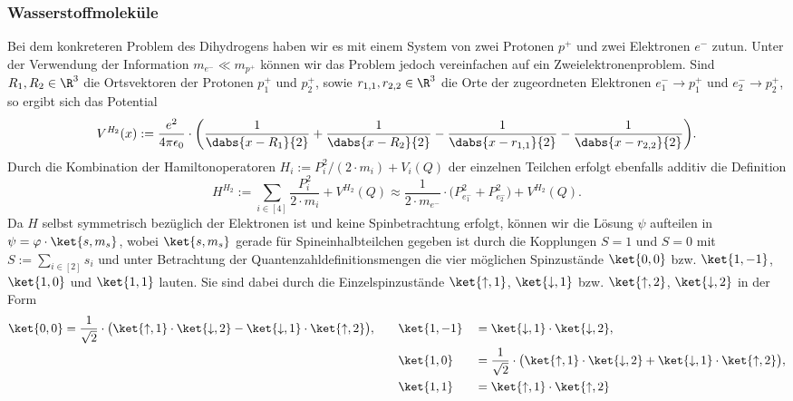 \documentclass[../main.tex]{subfiles}
\begin{document}
        \subsubsection*{Wasserstoffmoleküle}
            Bei dem konkreteren Problem des Dihydrogens  haben wir es mit einem System von zwei Protonen $p^+$ und zwei Elektronen $e^-$ zutun. Unter der Verwendung der Information $m_{e^-}\ll m_{p^+}$ können wir das Problem jedoch vereinfachen auf ein Zweielektronenproblem. Sind $R_1,R_2\in\R^3$ die Ortsvektoren der Protonen $p_1^+$ und $p_2^+$, sowie $r_{1,1},r_{2,2}\in\R^3$ die Orte der zugeordneten Elektronen $e_1^-\to p_1^+$ und $e_2^-\to p_2^+$, so ergibt sich das Potential 
            \[
                V^{\textit{H}_2}(x) := \frac{e^2}{4\pi\epsilon_0}\cdot\bigg(
                    \frac{1}{\dabs{x - R_1}{2}} + \frac{1}{\dabs{x - R_2}{2}} - \frac{1}{\dabs{x - r_{1,1}}{2}} - \frac{1}{\dabs{x - r_{2,2}}{2}}
                \bigg).
            \]
            Durch die Kombination der Hamiltonoperatoren $H_i:=P_i^2/(2\cdot m_i) + V_i(Q)$ der einzelnen Teilchen erfolgt ebenfalls additiv die Definition
            \[
                H^{\textit{H}_2} := \sum_{i\in[4]}\frac{P_i^2}{2\cdot m_i} + V^{\textit{H}_2}(Q) \approx \frac{1}{2\cdot m_{e^-}}\cdot\Big(P_{e_1^-}^2 + P_{e_2^-}^2\Big) + V^{\textit{H}_2}(Q).
            \]
            Da $H$ selbst symmetrisch bezüglich der Elektronen ist und keine Spinbetrachtung erfolgt, können wir die Lösung $\psi$ aufteilen in $\psi = \varphi\cdot\ket{s,m_s}$, wobei $\ket{s,m_s}$ gerade für Spineinhalbteilchen gegeben ist durch die Kopplungen $S = 1$ und $S = 0$ mit $S:=\sum_{i\in[2]}s_i$ und unter Betrachtung der Quantenzahldefinitionsmengen die vier möglichen Spinzustände $\ket{0,0}$ bzw. $\ket{1,-1}$, $\ket{1,0}$ und $\ket{1,1}$ lauten. Sie sind dabei durch die Einzelspinzustände $\ket{\uparrow,1}$, $\ket{\downarrow,1}$ bzw. $\ket{\uparrow,2}$, $\ket{\downarrow,2}$ in der Form 
            \begin{alignat*}{3}
                \ket{0,0} &= \frac{1}{\sqrt{2}}\cdot\big(\ket{\uparrow,1}\cdot\ket{\downarrow,2} - \ket{\downarrow,1}\cdot\ket{\uparrow,2}\big),\quad&& \ket{1,-1} &&= \ket{\downarrow,1}\cdot\ket{\downarrow,2},\\
                & && \ket{1,0} &&= \frac{1}{\sqrt{2}}\cdot\big(\ket{\uparrow,1}\cdot\ket{\downarrow,2} + \ket{\downarrow,1}\cdot\ket{\uparrow,2}\big),\\
                & && \ket{1,1} &&= \ket{\uparrow,1}\cdot\ket{\uparrow,2}
            \end{alignat*}
\end{document}
